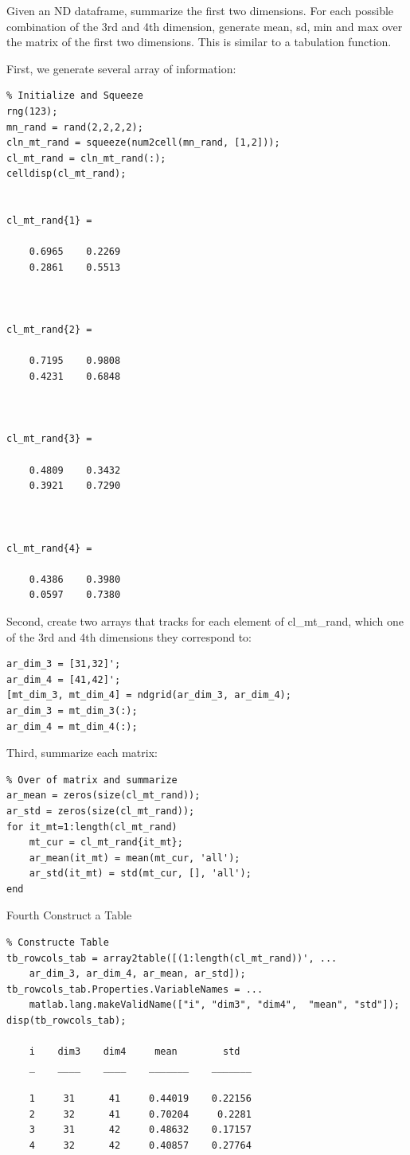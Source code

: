 \documentclass[
]{book}
\begin{document}
Given an ND dataframe, summarize the first two dimensions. For each
possible combination of the 3rd and 4th dimension, generate mean, sd,
min and max over the matrix of the first two dimensions. This is similar
to a tabulation function.

First, we generate several array of information:

\begin{verbatim}
% Initialize and Squeeze
rng(123);
mn_rand = rand(2,2,2,2);
cln_mt_rand = squeeze(num2cell(mn_rand, [1,2]));
cl_mt_rand = cln_mt_rand(:);
celldisp(cl_mt_rand);


cl_mt_rand{1} =
 
    0.6965    0.2269
    0.2861    0.5513



cl_mt_rand{2} =
 
    0.7195    0.9808
    0.4231    0.6848



cl_mt_rand{3} =
 
    0.4809    0.3432
    0.3921    0.7290



cl_mt_rand{4} =
 
    0.4386    0.3980
    0.0597    0.7380
\end{verbatim}

Second, create two arrays that tracks for each element of cl\_mt\_rand,
which one of the 3rd and 4th dimensions they correspond to:

\begin{verbatim}
ar_dim_3 = [31,32]';
ar_dim_4 = [41,42]';
[mt_dim_3, mt_dim_4] = ndgrid(ar_dim_3, ar_dim_4);
ar_dim_3 = mt_dim_3(:);
ar_dim_4 = mt_dim_4(:);
\end{verbatim}

Third, summarize each matrix:

\begin{verbatim}
% Over of matrix and summarize
ar_mean = zeros(size(cl_mt_rand));
ar_std = zeros(size(cl_mt_rand));
for it_mt=1:length(cl_mt_rand)
    mt_cur = cl_mt_rand{it_mt};
    ar_mean(it_mt) = mean(mt_cur, 'all');
    ar_std(it_mt) = std(mt_cur, [], 'all');
end
\end{verbatim}

Fourth Construct a Table

\begin{verbatim}
% Constructe Table
tb_rowcols_tab = array2table([(1:length(cl_mt_rand))', ...
    ar_dim_3, ar_dim_4, ar_mean, ar_std]);
tb_rowcols_tab.Properties.VariableNames = ...
    matlab.lang.makeValidName(["i", "dim3", "dim4",  "mean", "std"]);
disp(tb_rowcols_tab);

    i    dim3    dim4     mean        std  
    _    ____    ____    _______    _______

    1     31      41     0.44019    0.22156
    2     32      41     0.70204     0.2281
    3     31      42     0.48632    0.17157
    4     32      42     0.40857    0.27764
\end{verbatim}
\end{document}
